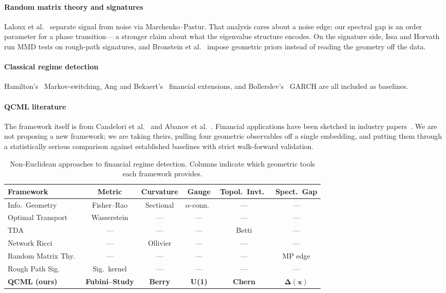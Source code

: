 \documentclass[3p]{elsarticle}
\begin{document}
\paragraph{Random matrix theory and signatures}
Laloux et al.~\cite{laloux1999} separate signal from noise via
Marchenko--Pastur.  That analysis cares about a noise edge; our
spectral gap is an order parameter for a phase transition---
a stronger claim about what the eigenvalue structure encodes.  On
the signature side, Issa and Horvath~\cite{issa_horvath2023} run
MMD tests on rough-path signatures, and Bronstein et
al.~\cite{bronstein2021} impose geometric priors instead of reading
the geometry off the data.

\paragraph{Classical regime detection}
Hamilton's~\cite{hamilton1989} Markov-switching, Ang and
Bekaert's~\cite{ang_bekaert2002} financial extensions, and
Bollerslev's~\cite{bollerslev1986} GARCH are all included as baselines.

\paragraph{QCML literature}
The framework itself is from Candelori et al.~\cite{candelori2025}
and Abanov et al.~\cite{abanov2025}.  Financial applications have
been sketched in industry papers~\cite{musaelian2024,samson2024}.
We are not proposing a new framework; we are taking theirs,
pulling four geometric observables off a single embedding, and
putting them through a statistically serious comparison against
established baselines with strict walk-forward validation.

\begin{table}[htb]
\centering
\caption{Non-Euclidean approaches to financial regime detection.
Columns indicate which geometric tools each framework provides.}
\label{tab:geometry_compare}
\small
\begin{tabular}{lccccc}
\toprule
Framework & Metric & Curvature & Gauge & Topol.\ Invt.\ & Spect.\ Gap \\
\midrule
Info.\ Geometry       & Fisher--Rao  & Sectional & $\alpha$-conn.\ & --- & --- \\
Optimal Transport     & Wasserstein  & ---       & ---            & --- & --- \\
TDA                   & ---          & ---       & ---            & Betti & --- \\
Network Ricci         & ---          & Ollivier  & ---            & --- & --- \\
Random Matrix Thy.\   & ---          & ---       & ---            & --- & MP edge \\
Rough Path Sig.\      & Sig.\ kernel & ---       & ---            & --- & --- \\
\midrule
\textbf{QCML (ours)}  & \textbf{Fubini--Study} & \textbf{Berry} & \textbf{U(1)} & \textbf{Chern} & $\bm{\Delta(x)}$ \\
\bottomrule
\end{tabular}
\end{table}
\end{document}
